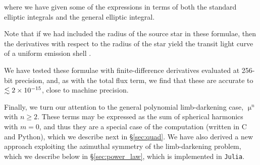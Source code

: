 \documentclass[modern]{aastex61}
\begin{document}
where we have given some of the expressions in terms of both the standard elliptic integrals
and the general elliptic integral.

Note that if we had included the radius of the source star in these formulae,
then the derivatives with respect to the radius of the star yield the
transit light curve of a uniform emission shell \citep{Schlawin2010}.

We have tested these formulae with finite-difference derivatives evaluated at
256-bit precision, and, as with the total flux term, we find that these are accurate 
to $\lesssim 2 \times 10^{-15}$, close to machine precision.

Finally, we turn our attention to the general polynomial limb-darkening case,
$\upmu^n$ with $n \ge 2$.  These terms may be expressed as the sum of
spherical harmonics with $m=0$, and thus they are a special case of the \starry 
computation (written in C and Python), which we describe next in \S \ref{sec:quad}.  
We have also derived a new approach exploiting the azimuthal symmetry of the 
limb-darkening problem, which we describe below in \S \ref{sec:power_law}, 
which is implemented in \texttt{Julia}.


%
\clearpage
\end{document}
